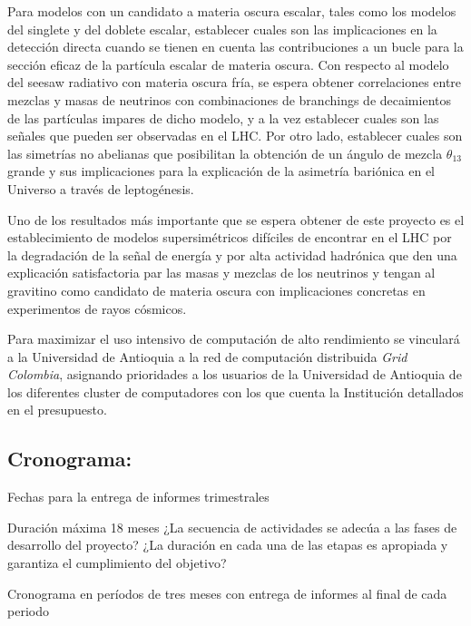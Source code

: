 \begin{darkmatter}
  Para modelos con un candidato a materia oscura escalar, tales como
  los modelos del singlete y del doblete escalar, establecer cuales son las
  implicaciones en la detección directa cuando se tienen en cuenta las
  contribuciones a un bucle  para la sección eficaz de la
  partícula escalar de materia oscura. Con respecto al modelo del
  seesaw radiativo con materia oscura fría, se espera obtener correlaciones entre mezclas y masas de
  neutrinos con combinaciones de branchings de decaimientos de las
  partículas impares de dicho modelo, y a la vez establecer cuales son
  las señales que pueden ser observadas en el LHC. Por otro lado,
  establecer cuales son las simetrías no abelianas que posibilitan
  la obtención de un ángulo de mezcla $\theta_{13}$ grande y sus
  implicaciones para la explicación de la asimetría bariónica en el
  Universo a través de leptogénesis.
\end{darkmatter}

Uno de los resultados más importante que se espera obtener de este
proyecto es el establecimiento de modelos supersimétricos difíciles de
encontrar en el LHC por la degradación de la señal de energía y por
alta actividad hadrónica que den una explicación satisfactoria par las
masas y mezclas de los  neutrinos y tengan al gravitino como candidato
de materia oscura con implicaciones concretas en experimentos de rayos
cósmicos.  

Para maximizar el uso intensivo de computación de alto rendimiento
se vinculará a la Universidad de Antioquia a la red de computación
distribuida \emph{Grid Colombia}, asignando prioridades a los usuarios
de la Universidad de Antioquia de los diferentes cluster de
computadores con los que cuenta la Institución detallados en el
presupuesto. 

\subsection{Cronograma:                                    }
\begin{evaluacion}
  Fechas para la entrega de informes trimestrales
\end{evaluacion}

\begin{instrucciones}
Duración máxima 18 meses
  ¿La secuencia de actividades se adecúa a las fases de desarrollo del proyecto? ¿La duración en cada una de las etapas es apropiada y garantiza el cumplimiento del objetivo?
\end{instrucciones}
Cronograma en períodos de tres meses con entrega de informes al final
de cada periodo

